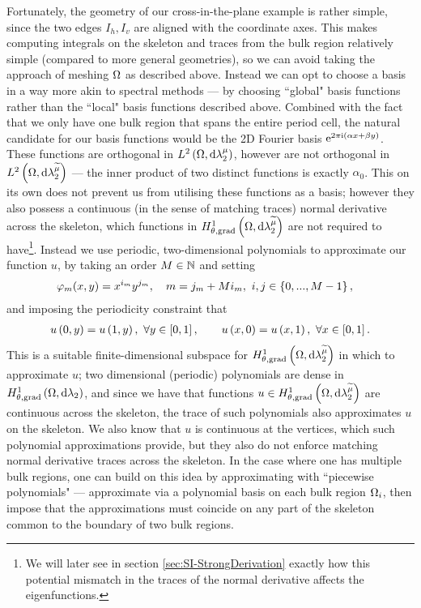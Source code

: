Fortunately, the geometry of our cross-in-the-plane example is rather simple, since the two edges $I_h, I_v$ are aligned with the coordinate axes.
This makes computing integrals on the skeleton and traces from the bulk region relatively simple (compared to more general geometries), so we can avoid taking the approach of meshing $\Omega$ as described above.
Instead we can opt to choose a basis in a way more akin to spectral methods --- by choosing ``global" basis functions rather than the ``local" basis functions described above.
Combined with the fact that we only have one bulk region that spans the entire period cell, the natural candidate for our basis functions would be the 2D Fourier basis $\mathrm{e}^{2\pi\mathrm{i}(\alpha x + \beta y)}$.
These functions are orthogonal in $L^{2}\left( \Omega,\mathrm{d} \lambda_2^{\mu} \right)$, however are not orthogonal in $L^{2}\left( \Omega,\mathrm{d} \lambda_2^{\widetilde{\mu}} \right)$ --- the inner product of two distinct functions is exactly $\alpha_0$.
This on its own does not prevent us from utilising these functions as a basis; however they also possess a continuous (in the sense of matching traces) normal derivative across the skeleton, which functions in $H^1_{\theta, \mathrm{grad}}\left( \Omega, \mathrm{d}\lambda_2^{\widetilde{\mu}} \right)$ are not required to have\footnote{We will later see in section \ref{sec:SI-StrongDerivation} exactly how this potential mismatch in the traces of the normal derivative affects the eigenfunctions.}.
Instead we use periodic, two-dimensional polynomials to approximate our function $u$, by taking an order $M\in\mathbb{N}$ and setting
\begin{align} \label{eq:2DPolyBasisDef}
	\varphi_m(x,y) &= x^{i_m} y^{j_m}, \quad m = j_m + Mi_m, \ i,j\in\clbracs{0,...,M-1},
\end{align}
and imposing the periodicity constraint that
\begin{align*}
	u\left( 0,y \right) = u\left( 1,y \right), \ \forall y\in\left[ 0,1 \right], 
	\qquad 
	u\left( x,0 \right) = u\left( x,1 \right), \ \forall x\in\left[ 0,1 \right].
\end{align*}
This is a suitable finite-dimensional subspace for $H^1_{\theta, \mathrm{grad}}\left( \Omega, \mathrm{d}\lambda_2^{\widetilde{\mu}} \right)$ in which to approximate $u$; two dimensional (periodic) polynomials are dense in $H^1_{\theta, \mathrm{grad}}\left( \Omega, \mathrm{d}\lambda_2 \right)$, and since we have that functions $u\in H^1_{\theta, \mathrm{grad}}\left( \Omega, \mathrm{d}\lambda_2^{\widetilde{\mu}} \right)$ are continuous across the skeleton, the trace of such polynomials also approximates $u$ on the skeleton.
We also know that $u$ is continuous at the vertices, which such polynomial approximations provide, but they also do not enforce matching normal derivative traces across the skeleton.
In the case where one has multiple bulk regions, one can build on this idea by approximating with ``piecewise polynomials" --- approximate via a polynomial basis on each bulk region $\Omega_i$, then impose that the approximations must coincide on any part of the skeleton common to the boundary of two bulk regions.

